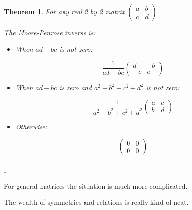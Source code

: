 \documentclass{article}
\newtheorem{theorem}{Theorem}
\begin{document}
\begin{theorem}
For any real 2 by 2 matrix $\begin{pmatrix} a & b \\ c & d \end{pmatrix}$

The  Moore-Penrose inverse is:


\begin{itemize}


\item When $a d - b c$ is not zero:

\[
\frac{1}{a d - b c}
\begin{pmatrix} d & -b \\ -c & a \end{pmatrix} 
\]

\item When $a d - b c$ is zero and $a^2 + b^2 + c^2 + d^2$ is not zero:

\[ 
\frac{1}{a^2 + b^2 + c^2 + d^2}
\begin{pmatrix} a & c \\ b & d \end{pmatrix}
\]

\item Otherwise:

\[ 
\begin{pmatrix} 0 & 0 \\ 0 & 0 \end{pmatrix}
\]
\end{itemize}
.
\\ $\square$
\end{theorem}

For general matrices the situation is much more complicated. 

The wealth of symmetries and relations is really kind of neat.
\end{document}
